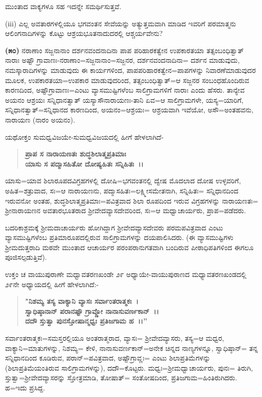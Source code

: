 \noindent
ಮುಂತಾದ ವಾಕ್ಯಗಳೂ ಸಹ ಇದನ್ನೇ ಸಮರ್ಥಿಸುತ್ತವೆ.

(iii) ಎಲ್ಲ ಅವತಾರಗಳಲ್ಲಿಯೂ ಭಗವಂತನ ಸೇವೆಯನ್ನು ಅತ್ಯುತ್ತಮವಾಗಿ ಮಾಡಿದ ಇವರಿಗೆ ಪರಮಾತ್ಮನು ಆಲಿಂಗನಾದಿಗಳನ್ನು ಕೊಟ್ಟು ಆಶ್ರಯಭೂತನಾದುದರಲ್ಲಿ ಆಶ್ಚರ್ಯವೇನು?

\textbf{(೫೦)} ನರಾಣಾಂ ಸಜ್ಜನಾನಾಂ ದರ್ಶನವಂದನಾದಿನಾ ಪಾಪ ಪರಿಹಾರಕತ್ವೇನ ಉಪಕಾರತಯಾ ತತ್ಸಂಬಂಧಿತ್ವಾತ್ ನಾರಾಃ ಅಷ್ಟೌ ಗ್ರಾವಾಣಃ-ನರಾಣಾಂ=ಸಜ್ಜನಾನಾಂ=ಸಜ್ಜನರ, ದರ್ಶನವಂದನಾದಿನಾ= ದರ್ಶನ ಮಾಡುವುದು, ನಮಸ್ಕಾರಾದಿಗಳನ್ನು ಮಾಡುವುದು ಈ ಕಾರ್ಯಗಳಿಂದ, ಪಾಪಪರಿಹಾರಕತ್ವೇನ=ಪಾಪಗಳನ್ನು ನಿವಾರಣೆಮಾಡುವುದರ ಮೂಲಕ, ಉಪಕಾರತಯಾ=ಉಪಕಾರ ಮಾಡುವುದರಿಂದ, ತತ್ಸಂಬಂಧಿತ್ವಾತ್=ಆ ಸಜ್ಜನರ ಸಂಬಂಧಹೊಂದಿರುವ ಕಾರಣದಿಂದ, ಅಷ್ಟೌಗ್ರಾವಾಣಃ=ಎಂಟು ವ್ಯಾಸಮುಷ್ಟಿಗಳೆಂಬ ಸಾಲಿಗ್ರಾಮಗಳಿಗೆ ನಾರಾಃ ಎಂದು ಹೆಸರು. ತಾನ್ಯೇವ ಅಯನಂ ಆಶ್ರಯಃ ಸನ್ನಿಧಾನತ್ವಾತ್ ಯಸ್ಯಾಸೌ\break ನಾರಾಯಣಃ-ತಾನಿ ಏವ=ಆ ಸಾಲಿಗ್ರಾಮಗಳೇ, ಯಸ್ಯ=ಯಾರಿಗೆ, ಸನ್ನಿಧಾನತ್ವಾತ್=\-ಸನ್ನಿಧಾನದ ಕಾರಣದಿಂದ, ಅಯನಂ=ಆಶ್ರಯಃ= ಆಶ್ರಯವಾಗಿ ಇವೆಯೋ, ಅಸೌ=\-ಅಂತಹವನು, ನಾರಾಯಣ (ನಾರಂ ಅಯನಂ).

ಯಥೋಕ್ತಂ ಸುಮಧ್ವವಿಜಯೇ-ಸುಮಧ್ವವಿಜಯದಲ್ಲಿ ಹೀಗೆ ಹೇಳಲಾಗಿದೆ-

\begin{verse}
\textbf{ಪ್ರಾಪ ಸ ನಾರಾಯಣತಃ ಶುದ್ಧಶಿಲಾತ್ಮಪ್ರತಿಮಾಃ} \\\textbf{ಯಾಸು ಸ ಪದ್ಮಾಸಹಿತೋ ದೋಷ್ಯಹಿತಃ ಸನ್ನಿಹಿತಃ~।।}
\end{verse}

ಯಾಸು=ಯಾವ ಶಿಲಾರೂಪದವಿಗ್ರಹಗಳಲ್ಲಿ ದೋಷಿ=ಭಗವಂತನಲ್ಲಿ ದ್ವೇಷ ಮೊದಲಾದ ದೋಷ ಉಳ್ಳವರಿಗೆ, ಅಹಿತ=ಶತ್ರುವಾದ, ಸಃ=ಆ ನಾರಾಯಣನು, ಪದ್ಮಾಸಹಿತಃ=ಲಕ್ಷ್ಮೀ\-ಸಮೇತನಾಗಿ, ಸನ್ನಿಹಿತಃ= ಸನ್ನಿಧಾನದಿಂದ ಇರುವನೋ ಅಂತಹ, ಶುದ್ಧಶಿಲಾತ್ಮಪ್ರತಿಮಾಃ=\-ಪವಿತ್ರವಾದ ಶಿಲಾ ರೂಪದಿಂದ ಇರುವ ವಿಗ್ರಹಗಳನ್ನು ನಾರಾಯಣತಃ= ಶ‍್ರೀನಾರಾಯಣನ ಅವತಾರಭೂತರಾದ ಶ‍್ರೀವೇದವ್ಯಾಸದೇವರಿಂದ, ಸಃ=ಆ ಮಧ್ವಾಚಾರ್ಯರು, ಪ್ರಾಪ=\-ಪಡೆದರು.

ಬದರಿಕಾಶ್ರಮಕ್ಕೆ ಶ‍್ರೀಮದಾಚಾರ್ಯರು ಹೋಗಿದ್ದಾಗ ಶ‍್ರೀವೇದವ್ಯಾಸದೇವರು ಪರಮಪವಿತ್ರವಾದ ಎಂಟು ವ್ಯಾಸಮುಷ್ಟಿಗಳೆಂಬ ಪ್ರತಿಮಾರೂಪದಲ್ಲಿರುವ ಸಾಲಿಗ್ರಾಮಗಳನ್ನು ದಯಪಾಲಿಸಿದರು. (ಈ ವ್ಯಾಸಮುಷ್ಟಿಗಳು ಶ‍್ರೀಮದುತ್ತರಾದಿ ಮಠವೇ ಮುಂತಾದ ಆಚಾರ್ಯರ ಪರಂಪರಾನುಗತವಾಗಿ ಬಂದಿರುವ ಪೀಠಾಧಿಪತಿಗಳಿಂದ ಈಗಲೂ ಪೂಜಿಸಲ್ಪಡುತ್ತಿವೆ).

ಉಕ್ತಂ ಚ ವಾಯುಪುರಾಣೇ ಮಧ್ವಾವತರಣಖಂಡೇ ೨೯ ಅಧ್ಯಾಯೇ-ವಾಯು\-ಪುರಾಣದ ಮಧ್ಯಾವತರಣಖಂಡದಲ್ಲಿ ೨೯ನೇ ಅಧ್ಯಾಯದಲ್ಲಿ ಹೀಗೆ ಹೇಳಲಾಗಿದೆ:-

\begin{verse}
\textbf{"ನಿಶಮ್ಯ ತಸ್ಯ ವಾಕ್ಯಾನಿ ವ್ಯಾಸಃ ಸರ್ವಾಂತರಾತ್ಮಕಃ~।}\\\textbf{ಸ್ವಾಧಿಷ್ಠಾನಾನ್ ಪರಾನಷ್ಟೌ ಗ್ರಾವ್ಣೋ ನಾನಾಸುವರ್ಣಕಾನ್~।।}\\\textbf{ದದೌ ಸ್ತುತ್ವಾ ಪುನಸ್ತೋಷಾನ್ಮಧ್ವಃ ಪ್ರತಿಜಗಾಮ ಹ~।।”}
\end{verse}

ಸರ್ವಾಂತರಾತ್ಮಕಃ=ಸಮಸ್ತರಲ್ಲಿಯೂ ಅಂತರಾತ್ಮರಾದ, ವ್ಯಾಸಃ= ಶ‍್ರೀವೇದವ್ಯಾಸರು, ತಸ್ಯ=ಆ ಮಧ್ವರ, ವಾಕ್ಯಾನಿ=ಮಾತುಗಳನ್ನು, ನಿಶಮ್ಯ= ಕೇಳಿ, ನಾನಾಸುವರ್ಣಕಾನ್=ಅನೇಕ ಚಿನ್ನದ ನಾಣ್ಯಗಳನ್ನೂ, ಸ್ವಾಧಿಷ್ಠಾನ್= ತನ್ನ ಸನ್ನಿಧಾನದಿಂದ ಕೂಡಿರುವ, ಪರಾನ್=ಪವಿತ್ರ\-ವಾದ, ಅಷ್ಟೌಗ್ರಾವ್ಣಃ= ಎಂಟು ಶಿಲಾಪ್ರತಿಮೆಗಳನ್ನು (ಶಿಲಾಪ್ರತಿಮೆಯಂತಿರುವ ಸಾಲಿಗ್ರಾಮಗಳನ್ನು), ದದೌ=ಕೊಟ್ಟರು. ಮಧ್ವಃ=ಶ‍್ರೀಮಧ್ವಾಚಾರ್ಯರು, ಪುನಃ= ತಿರುಗಿ, ಸ್ತುತ್ವಾ\break =ಶ‍್ರೀವೇದವ್ಯಾಸರನ್ನು ಸ್ತೋತ್ರಮಾಡಿ, ತೋಷಾತ್= ಸಂತೋಷದಿಂದ, ಪ್ರತಿಜಗಾಮ=\break ಹಿಂತಿರುಗಿದರು. ಹ=ಇದು ಪ್ರಸಿದ್ದ.

